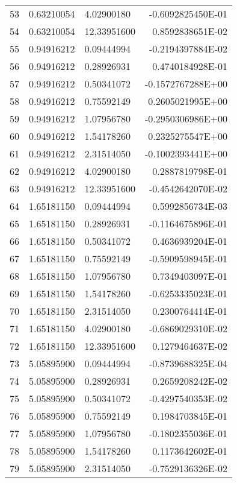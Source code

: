 \begin{longtable}{@{\extracolsep{\fill}}cllr@{}}
53  &  0.63210054  &  4.02900180  &  -0.6092825450E-01 \\
54  &  0.63210054  &  12.33951600  &   0.8592838651E-02 \\
55  &  0.94916212  &  0.09444994  &  -0.2194397884E-02 \\
56  &  0.94916212  &  0.28926931  &   0.4740184928E-01 \\
57  &  0.94916212  &  0.50341072  &  -0.1572767288E+00 \\
58  &  0.94916212  &  0.75592149  &   0.2605021995E+00 \\
59  &  0.94916212  &  1.07956780  &  -0.2950306986E+00 \\
60  &  0.94916212  &  1.54178260  &   0.2325275547E+00 \\
61  &  0.94916212  &  2.31514050  &  -0.1002393441E+00 \\
62  &  0.94916212  &  4.02900180  &   0.2887819798E-01 \\
63  &  0.94916212  &  12.33951600  &  -0.4542642070E-02 \\
64  &  1.65181150  &  0.09444994  &   0.5992856734E-03 \\
65  &  1.65181150  &  0.28926931  &  -0.1164675896E-01 \\
66  &  1.65181150  &  0.50341072  &   0.4636939204E-01 \\
67  &  1.65181150  &  0.75592149  &  -0.5909598945E-01 \\
68  &  1.65181150  &  1.07956780  &   0.7349403097E-01 \\
69  &  1.65181150  &  1.54178260  &  -0.6253335023E-01 \\
70  &  1.65181150  &  2.31514050  &   0.2300764414E-01 \\
71  &  1.65181150  &  4.02900180  &  -0.6869029310E-02 \\
72  &  1.65181150  &  12.33951600  &   0.1279464637E-02 \\
73  &  5.05895900  &  0.09444994  &  -0.8739688325E-04 \\
74  &  5.05895900  &  0.28926931  &   0.2659208242E-02 \\
75  &  5.05895900  &  0.50341072  &  -0.4297540353E-02 \\
76  &  5.05895900  &  0.75592149  &   0.1984703845E-01 \\
77  &  5.05895900  &  1.07956780  &  -0.1802355036E-01 \\
78  &  5.05895900  &  1.54178260  &   0.1173642602E-01 \\
79  &  5.05895900  &  2.31514050  &  -0.7529136326E-02 \\

\end{longtable}
